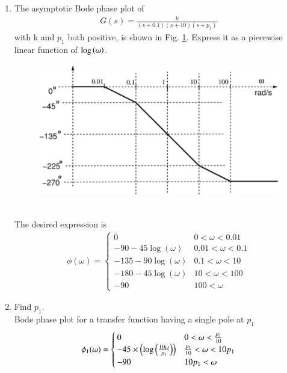 
\begin{enumerate}[label=\thesubsection.\arabic*.,ref=\thesubsection.\theenumi]


\item The asymptotic Bode phase plot of 
%
\begin{align}
\label{eq:ee18btech11037_gs}
G(s) = \frac{k}{(s+0.1)(s+10)(s+{p_1})}
\end{align}
%
with k and $p_1$ both positive, is shown in Fig. \ref{fig:ee18btech11037}.  Express it as a piecewise linear function of $\log \left(\omega\right)$.
\begin{figure}[!ht]
\centering
\includegraphics[width=\columnwidth]{./figs/ee18btech11037/ee18btech11037.eps}
\caption{}
\label{fig:ee18btech11037}
\end{figure}
\\
\solution The desired expression is
\begin{align}
\label{eq:ee18btech11037_totalphase}
 \phi(\omega) = 
 \begin{cases} 
        0 & 0<\omega<0.01 \\
      -90-45\log(\omega)& 0.01<\omega<0.1 \\
      -135-90\log(\omega)& 0.1<\omega<10 \\
      -180-45\log(\omega)& 10<\omega<100 \\
      -90 & 100<\omega  
 \end{cases}
\end{align}

\item Find  $p_1$.
\\
\solution 
Bode phase plot for a transfer function having a single pole at $p_1$
\begin{align}
\label{eq:ee18btech11037_part1_of_phase}
 \phi _1(\omega) = 
 \begin{cases} 
        0 & 0<\omega< \frac{p_1}{10} \\
      -45\times\left(\log\left(\frac{10\omega}{p_1}\right)\right)& \frac{p_1}{10}<\omega<10p_1 \\
      -90 & 10p_1<\omega  
 \end{cases}
\end{align}


\end{enumerate}
